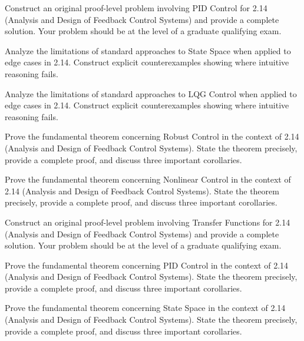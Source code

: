 \documentclass[12pt,a4paper]{exam}
\begin{document}
\begin{questions}
\question[3]
Construct an original proof-level problem involving PID Control for 2.14 (Analysis and Design of Feedback Control Systems) and provide a complete solution. Your problem should be at the level of a graduate qualifying exam.

\vspace{0.3cm}

\question[2]
Analyze the limitations of standard approaches to State Space when applied to edge cases in 2.14. Construct explicit counterexamples showing where intuitive reasoning fails.

\vspace{0.3cm}

\question[5]
Analyze the limitations of standard approaches to LQG Control when applied to edge cases in 2.14. Construct explicit counterexamples showing where intuitive reasoning fails.

\vspace{0.3cm}

\question[5]
Prove the fundamental theorem concerning Robust Control in the context of 2.14 (Analysis and Design of Feedback Control Systems). State the theorem precisely, provide a complete proof, and discuss three important corollaries.

\vspace{0.3cm}

\question[3]
Prove the fundamental theorem concerning Nonlinear Control in the context of 2.14 (Analysis and Design of Feedback Control Systems). State the theorem precisely, provide a complete proof, and discuss three important corollaries.

\vspace{0.3cm}

\question[3]
Construct an original proof-level problem involving Transfer Functions for 2.14 (Analysis and Design of Feedback Control Systems) and provide a complete solution. Your problem should be at the level of a graduate qualifying exam.

\vspace{0.3cm}

\question[4]
Prove the fundamental theorem concerning PID Control in the context of 2.14 (Analysis and Design of Feedback Control Systems). State the theorem precisely, provide a complete proof, and discuss three important corollaries.

\vspace{0.3cm}

\question[4]
Prove the fundamental theorem concerning State Space in the context of 2.14 (Analysis and Design of Feedback Control Systems). State the theorem precisely, provide a complete proof, and discuss three important corollaries.


\end{questions}
\end{document}
